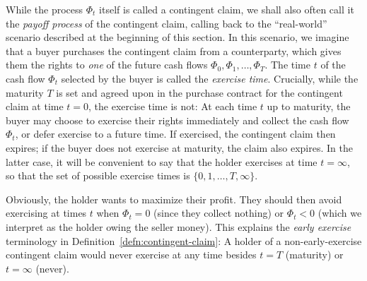 \documentclass[11pt, openany, oneside]{book}
\theoremstyle{definition}
\theoremstyle{remark}
\theoremstyle{boldital}
\numberwithin{equation}{section}
\begin{document}
While the process $\Phi_t$ itself is called a contingent claim, we shall also often call it the \textit{payoff process} of the contingent claim, calling back to the ``real-world'' scenario described at the beginning of this section. In this scenario, we imagine that a buyer purchases the contingent claim from a counterparty, which gives them the rights to \textit{one} of the future cash flows $\Phi_0,\Phi_1,\ldots,\Phi_T$. The time $t$ of the cash flow $\Phi_t$ selected by the buyer is called the \textit{exercise time}. Crucially, while the maturity $T$ is set and agreed upon in the purchase contract for the contingent claim at time $t=0$, the exercise time is not: At each time $t$ up to maturity, the buyer may choose to exercise their rights immediately and collect the cash flow $\Phi_t$, or defer exercise to a future time. If exercised, the contingent claim then expires; if the buyer does not exercise at maturity, the claim also expires. In the latter case, it will be convenient to say that the holder exercises at time $t=\infty$, so that the set of possible exercise times is $\{0,1,\ldots,T,\infty\}$.

Obviously, the holder wants to maximize their profit. They should then avoid exercising at times $t$ when $\Phi_t=0$ (since they collect nothing) or $\Phi_t<0$ (which we interpret as the holder owing the seller money). This explains the \textit{early exercise} terminology in Definition~\ref{defn:contingent-claim}: A holder of a non-early-exercise contingent claim would never exercise at any time besides $t=T$ (maturity) or $t=\infty$ (never).
\end{document}
